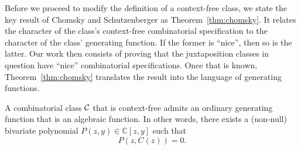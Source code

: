 \documentclass[12pt, a4paper, twoside]{report}
\begin{document}
Before we proceed to modify the definition of a context-free class, we state the key result of Chomsky and Schutzenberger as Theorem~\ref{thm:chomsky}. It relates the character of the class's context-free combinatorial specification to the character of the class' generating function. If the former is ``nice'', then so is the latter. Our work then consists of proving that the juxtaposition classes in question have ``nice'' combinatorial specifications. Once that is known, Theorem~\ref{thm:chomsky} translates the result into the language of generating functions.

\begin{theorem}
\label{thm:chomsky}
A combinatorial class $\mathcal{C}$ that is context-free admits an ordinary generating function that is an algebraic function. In other words, there exists a (non-null) bivariate polynomial $P(z,y) \in \mathbb{C}[z,y]$ such that $$P(z,C(z)) = 0.$$
\end{theorem}
\end{document}
